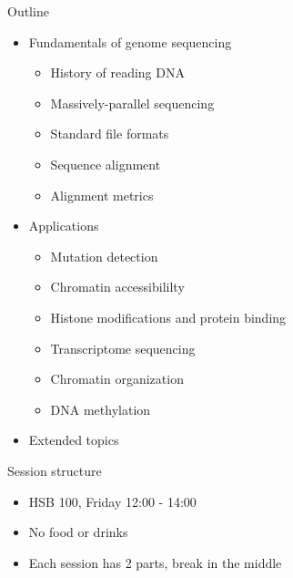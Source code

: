 \documentclass[
  ignorenonframetext,
]{beamer}
\providecommand{\tightlist}{%
  \setlength{\itemsep}{0pt}\setlength{\parskip}{0pt}}
\begin{document}
\begin{frame}{Outline}
\protect\hypertarget{outline}{}

\begin{itemize}
\tightlist
\item
  Fundamentals of genome sequencing

  \begin{itemize}
  \tightlist
  \item
    History of reading DNA
  \item
    Massively-parallel sequencing
  \item
    Standard file formats
  \item
    Sequence alignment
  \item
    Alignment metrics
  \end{itemize}
\item
  Applications

  \begin{itemize}
  \tightlist
  \item
    Mutation detection
  \item
    Chromatin accessibililty
  \item
    Histone modifications and protein binding
  \item
    Transcriptome sequencing
  \item
    Chromatin organization
  \item
    DNA methylation
  \end{itemize}
\item
  Extended topics
\end{itemize}

\begin{block}{Session structure}

\begin{itemize}
\tightlist
\item
  HSB 100, Friday 12:00 - 14:00
\item
  No food or drinks
\item
  Each session has 2 parts, break in the middle
\end{itemize}

\end{block}

\end{frame}
\end{document}
